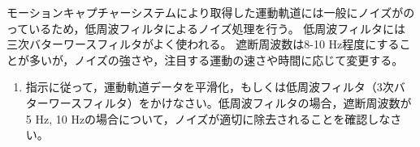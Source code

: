 \documentclass{jsarticle}
\begin{document}
モーションキャプチャーシステムにより取得した運動軌道には一般にノイズがのっているため，低周波フィルタによるノイズ処理を行う。
低周波フィルタには三次バターワースフィルタがよく使われる。
遮断周波数は8-10 Hz程度にすることが多いが，ノイズの強さや，注目する運動の速さや時間に応じて変更する。

\begin{enumerate}
  \item 指示に従って，運動軌道データを平滑化，もしくは低周波フィルタ（3次バターワースフィルタ）をかけなさい。低周波フィルタの場合，遮断周波数が5 Hz, 10 Hzの場合について，ノイズが適切に除去されることを確認しなさい。
\end{enumerate}


\end{document}
